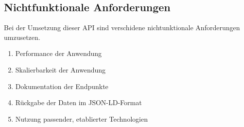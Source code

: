 \subsection{Nichtfunktionale Anforderungen} \label{sec:N_Anforderungen}
    Bei der Umsetzung dieser \ac{API} sind verschidene nichtunktionale Anforderungen umzusetzen.
    \begin{enumerate}
        \item Performance der Anwendung \label{nf:one}
        \item Skalierbarkeit der Anwendung \label{nf:two}
        \item Dokumentation der Endpunkte \label{nf:three}
        \item Rückgabe der Daten im JSON-LD-Format \label{nf:four}
        \item Nutzung passender, etablierter Technologien \label{nf:five}
    \end{enumerate}